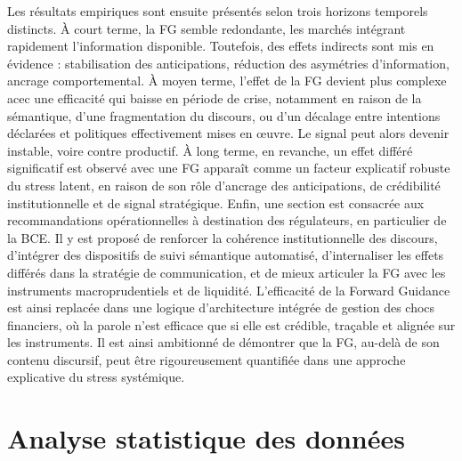 Les résultats empiriques sont ensuite présentés selon trois horizons temporels distincts. À court terme, la FG semble redondante, les marchés intégrant rapidement l’information disponible. Toutefois, des effets indirects sont mis en évidence : stabilisation des anticipations, réduction des asymétries d’information, ancrage comportemental. À moyen terme, l’effet de la FG devient plus complexe acec une efficacité qui baisse en période de crise, notamment en raison de la sémantique, d’une fragmentation du discours, ou d’un décalage entre intentions déclarées et politiques effectivement mises en œuvre. Le signal peut alors devenir instable, voire contre productif. À long terme, en revanche, un effet différé significatif est observé avec une FG apparaît comme un facteur explicatif robuste du stress latent, en raison de son rôle d’ancrage des anticipations, de crédibilité institutionnelle et de signal stratégique. Enfin, une section est consacrée aux recommandations opérationnelles à destination des régulateurs, en particulier de la BCE. Il y est proposé de renforcer la cohérence institutionnelle des discours, d’intégrer des dispositifs de suivi sémantique automatisé, d’internaliser les effets différés dans la stratégie de communication, et de mieux articuler la FG avec les instruments macroprudentiels et de liquidité. L’efficacité de la Forward Guidance est ainsi replacée dans une logique d’architecture intégrée de gestion des chocs financiers, où la parole n’est efficace que si elle est crédible, traçable et alignée sur les instruments. Il est ainsi ambitionné de démontrer que la FG, au-delà de son contenu discursif, peut être rigoureusement quantifiée dans une approche explicative du stress systémique.

\section{Analyse statistique des données}

